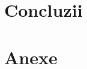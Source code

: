 \documentclass[a4paper,12pt,twoside]{memoir}
\begin{document}
\chapter{Concluzii}
\label{ch:conclusion}

\cleardoublepage

\backmatter




\appendix
\pagestyle{xappendixpagestyle}%
\chapter{Anexe}
\label{ch:anexe}

\end{document}
